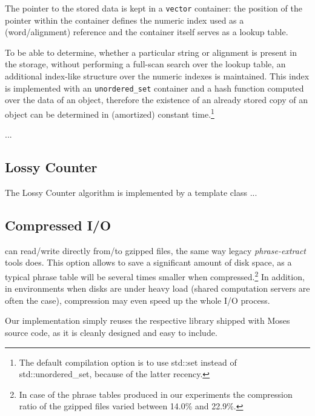 The pointer to the stored data is kept in a \texttt{vector} container: the position of
the pointer within the container defines the numeric index used as a (word/alignment) reference
and the container itself serves as a lookup table.

To be able to determine, whether a particular string or alignment is present in the storage,
without performing a full-scan search over the lookup table, an additional index-like
structure over the numeric indexes is maintained.
This index is implemented with an \texttt{unordered_set} container and a hash function computed
over the data of an object, therefore the existence of an already stored copy of an object can be
determined in (amortized) constant time.\footnote{The default compilation
option is to use std::set instead of std::unordered_set, because of the latter recency.}

... %

\subsection{Lossy Counter}

The Lossy Counter algorithm is implemented by a template class ...

\subsection{Compressed I/O}

\Eppex{} can read/write directly from/to gzipped files, the same way legacy \emph{phrase-extract}
tools does.
This option allows to save a significant amount of disk space, as a typical phrase table will be
several times smaller when compressed.\footnote{In case of the phrase tables produced in our experiments
the compression ratio of the gzipped files varied between 14.0\% and 22.9\%.}
In addition, in environments when disks are under heavy load (shared computation servers are often
the case), compression may even speed up the whole I/O process.

Our implementation simply reuses the respective library shipped with Moses source code,
as it is cleanly designed and easy to include.
